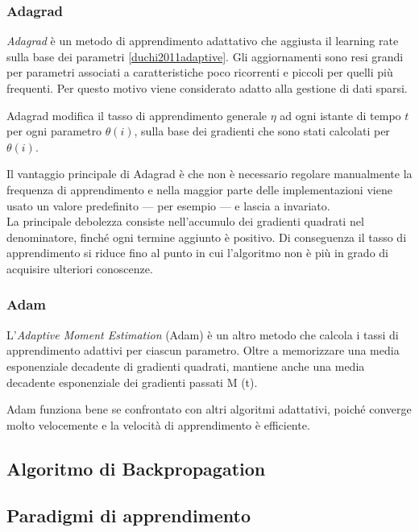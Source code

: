 \subsubsection{Adagrad}
\label{subsubsec:adagrad}

\emph{Adagrad} è un metodo di apprendimento adattativo che aggiusta il learning rate sulla base dei parametri \ref{duchi2011adaptive}.
Gli aggiornamenti sono resi grandi per parametri associati a caratteristiche poco ricorrenti e piccoli per quelli più frequenti. Per questo motivo viene considerato adatto alla gestione di dati sparsi.

Adagrad modifica il tasso di apprendimento generale $\eta$ ad ogni istante di tempo $t$ per ogni parametro $\theta(i)$, sulla base dei gradienti che sono stati calcolati per $\theta(i)$.

Il vantaggio principale di Adagrad è che non è necessario regolare manualmente la frequenza di apprendimento e nella maggior parte delle implementazioni viene usato un valore predefinito --- per esempio  --- e lascia a invariato.\\
La principale debolezza consiste nell'accumulo dei gradienti quadrati nel denominatore, finché ogni termine aggiunto è positivo. Di conseguenza il tasso di apprendimento si riduce fino al punto in cui l'algoritmo non è più in grado di acquisire ulteriori conoscenze. 


\subsubsection{Adam}
\label{subsubsec:adam}

L'\emph{Adaptive Moment Estimation} (Adam) è un altro metodo che calcola i tassi di apprendimento adattivi per ciascun parametro. Oltre a memorizzare una media esponenziale decadente di gradienti quadrati, mantiene anche una media decadente esponenziale dei gradienti passati M (t).

Adam funziona bene se confrontato con altri algoritmi adattativi, poiché converge molto velocemente e la velocità di apprendimento è efficiente.


{\color{blue}
	\subsection{Algoritmo di Backpropagation}
	\label{subsec:backprop}}

\subsection{Paradigmi di apprendimento}
\label{subsec:Paradigmi di apprendimento}

